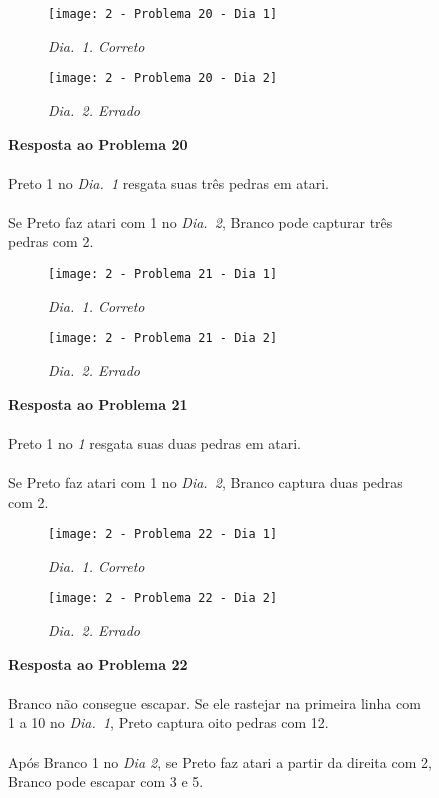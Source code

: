 \vfill

\begin{SCfigure}[][h!]
    \begin{subfigure}[t]{.31\textwidth}
        \texttt{[image: 2 - Problema 20 - Dia 1]}
        \caption*{\emph{Dia.\@~1. Correto}}
    \end{subfigure}
    \hfill
    \begin{subfigure}[t]{.31\textwidth}
        \texttt{[image: 2 - Problema 20 - Dia 2]}
        \caption*{\emph{Dia.\@~2. Errado}}
    \end{subfigure}
    \hfill
    \caption*{\textbf{Resposta ao Problema 20}\\\\Preto 1 no \emph{Dia.\@~1} resgata suas três pedras em atari.\\\\Se Preto faz atari com 1 no \emph{Dia.\@~2}, Branco pode capturar três pedras com 2.}
\end{SCfigure}

\vfill

\begin{SCfigure}[][h!]
    \begin{subfigure}[t]{.31\textwidth}
        \texttt{[image: 2 - Problema 21 - Dia 1]}
        \caption*{\emph{Dia.\@~1. Correto}}
    \end{subfigure}
    \hfill
    \begin{subfigure}[t]{.31\textwidth}
        \texttt{[image: 2 - Problema 21 - Dia 2]}
        \caption*{\emph{Dia.\@~2. Errado}}
    \end{subfigure}
    \hfill
    \caption*{\textbf{Resposta ao Problema 21}\\\\Preto 1 no \emph{1} resgata suas duas pedras em atari.\\\\Se Preto faz atari com 1 no \emph{Dia.\@~2}, Branco captura duas pedras com 2.}
\end{SCfigure}

\pagebreak

\begin{SCfigure}[][h!]
    \begin{subfigure}[t]{.31\textwidth}
        \texttt{[image: 2 - Problema 22 - Dia 1]}
        \caption*{\emph{Dia.\@~1. Correto}}
    \end{subfigure}
    \hfill
    \begin{subfigure}[t]{.31\textwidth}
        \texttt{[image: 2 - Problema 22 - Dia 2]}
        \caption*{\emph{Dia.\@~2. Errado}}
    \end{subfigure}
    \hfill
    \caption*{\textbf{Resposta ao Problema 22}\\\\Branco não consegue escapar. Se ele rastejar na primeira linha com 1 a 10 no \emph{Dia.\@~1}, Preto captura oito pedras com 12.\\\\Após Branco 1 no \emph{Dia 2}, se Preto faz atari a partir da direita com 2, Branco pode escapar com 3 e 5.}
\end{SCfigure}

